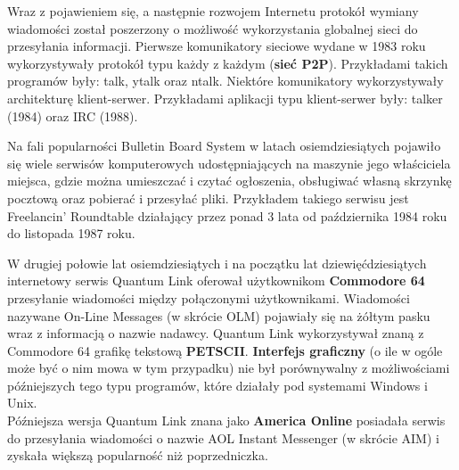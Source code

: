 \documentclass[a4paper,12pt]{article}
\begin{document}
\par Wraz z pojawieniem się, a następnie rozwojem Internetu protokół wymiany wiadomości został poszerzony o możliwość wykorzystania globalnej sieci do przesyłania informacji. Pierwsze komunikatory sieciowe wydane w 1983 roku wykorzystywały protokół typu każdy z każdym (\textbf{sieć P2P}). Przykładami takich programów były: talk, ytalk oraz ntalk.
Niektóre komunikatory wykorzystywały architekturę klient-serwer. Przykładami aplikacji typu klient-serwer były: talker (1984) oraz IRC (1988).

\par Na fali popularności Bulletin Board System w latach osiemdziesiątych pojawiło się wiele serwisów komputerowych udostępniających na maszynie jego właściciela miejsca, gdzie można umieszczać i czytać ogłoszenia, obsługiwać własną skrzynkę pocztową oraz pobierać i przesyłać pliki. Przykładem takiego serwisu jest Freelancin' Roundtable działający przez ponad 3 lata od października 1984 roku do listopada 1987 roku.

\par W drugiej połowie lat osiemdziesiątych i na początku lat dziewięćdziesiątych internetowy serwis Quantum Link oferował użytkownikom \textbf{Commodore 64} przesyłanie wiadomości między połączonymi użytkownikami. Wiadomości nazywane On-Line Messages (w skrócie OLM) pojawiały się na żółtym pasku wraz z informacją o nazwie nadawcy. Quantum Link wykorzystywał znaną z Commodore 64 grafikę tekstową \textbf{PETSCII}. \textbf{Interfejs graficzny} (o ile w ogóle może być o nim mowa w tym przypadku) nie był porównywalny z możliwościami późniejszych tego typu programów, które działały pod systemami Windows i Unix.\\
Późniejsza wersja Quantum Link znana jako \textbf{America Online} posiadała serwis do przesyłania wiadomości o nazwie AOL Instant Messenger (w skrócie AIM) i zyskała większą popularność niż poprzedniczka.
\end{document}
